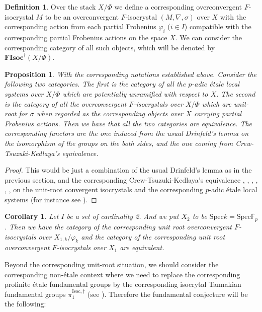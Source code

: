\documentclass[11pt]{book}
\newtheorem{proposition}[theorem]{Proposition}
\newtheorem{corollary}[theorem]{Corollary}
\theoremstyle{definition}
\newtheorem{definition}[theorem]{Definition}
\numberwithin{equation}{section}
\begin{document}
\begin{definition}
Over the stack $X/\Phi$ we define a corresponding overconvergent $F$-isocrystal $M$ to be an overconvergent $F$-isocrystal $(M,\nabla,\sigma)$ over $X$ with the corresponding action from each partial Frobenius $\varphi_i$ ($i\in I$) compatible with the corresponding partial Frobenius actions on the space $X$. We can consider the corresponding category of all such objects, which will be denoted by $\textbf{FIsoc}^\dagger(X/\Phi)$. 	
\end{definition}



\begin{proposition}
With the corresponding notations established above. Consider the following two categories. The first is the category of all the $p$-adic \'etale local systems over $X/\Phi$ which are potentially unramified with respect to $X$. The second is the category of all the overconvergent $F$-isocrystals over $X/\Phi$ which are unit-root for $\sigma$ when regarded as the corresponding objects over $X$ carrying partial Frobenius actions. Then we have that all the two categories are equivalence. The corresponding functors are the one induced from the usual Drinfeld's lemma on the isomorphism of the groups on the both sides, and the one coming from Crew-Tsuzuki-Kedlaya's equivalence.	
\end{proposition}
	


\begin{proof}
This would be just a combination of the usual Drinfeld's lemma as in the previous section, and the corresponding Crew-Tsuzuki-Kedlaya's equivalence \cite{Cr1}, \cite{Cr2}, \cite{Tsu}, \cite{Ked4}, \cite{Ked5}, \cite{Ked6}, \cite{Ked7} on the unit-root convergent isocrystals and the corresponding $p$-adic \'etale local systems (for instance see \cite[Theorem 1.3]{Tsu}).	
\end{proof}



\begin{corollary}  \label{corollary3.4}
Let $I$ be a set of cardinality 2. And we put $X_2$ to be $\mathrm{Spec} k=\mathrm{Spec}\overline{\mathbb{F}}_p$. Then we have the category of the corresponding unit root overconvergent $F$-isocrystals over $X_{1,k}/\varphi_k$ and the category of the corresponding unit root overconvergent $F$-isocrystals over $X_1$ are equivalent.	
\end{corollary}


\indent Beyond the corresponding unit-root situation, we should consider the corresponding non-\'etale context where we need to replace the corresponding profinite \'etale fundamental groups by the corresponding isocrytal Tannakian fundamental groups $\pi^{\mathrm{Isoc},\dagger}_1$ (see \cite[Appendix B]{DK}). Therefore the fundamental conjecture will be the following:
\end{document}
